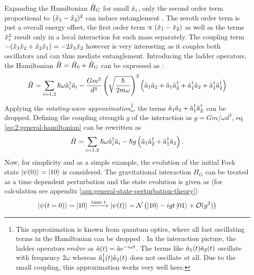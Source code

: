 Expanding the Hamiltonian $\hat{H}_G$ for small $\hat{x}_i$, only the second order term proportional to $(\hat{x}_1 - \hat{x}_2)^2$ can induce entanglement \cite{Krisnanda_2020}. The zeroth order term is just a overall energy offset, the first order term $\propto (\hat{x}_1 - \hat{x}_2)$ as well as the terms $\hat{x}^2_i$ result only in a local interaction for each mass separately. The coupling term $ - (\hat{x}_1\hat{x}_2 + \hat{x}_2\hat{x}_1) = -2\hat{x}_1\hat{x}_2$ however is very interesting as it couples both oscillators and can thus mediate entanglement.
Introducing the ladder operators, the Hamiltonian $\hat{H}=\hat{H}_0 + \hat{H}_G$ can be expressed as \cite{Carney_2018}:
\begin{equation}\label{eq:2:general-hamiltonian}
  \hat{H} = \sum_{i=1,2} \hbar \omega \hat{a}_i^\dagger \hat{a}_i - \frac{Gm^2}{d^3} \left(\sqrt{\frac{\hbar}{2m\omega}}\right)^2 \left( \hat{a}_1\hat{a}_2 + \hat{a}_1\hat{a}^\dagger_2 + \hat{a}^\dagger_1\hat{a}_2 + \hat{a}^\dagger_1\hat{a}^\dagger_2 \right)
\end{equation}
Applying the \textit{rotating-wave approximation}\footnote{This approximation is known from quantum optics, where all fast oscillating terms in the Hamiltonian can be dropped \cite{Carney_2018,Lami_2024}. In the interaction picture, the ladder operators evolve as $\hat{a}(t) = \hat{a}e^{-i\omega t}$. The terms like $\hat{a}_1(t)\hat{a}_2(t)$ oscillate with frequency $2\omega$ whereas $\hat{a}_1^\dagger(t) \hat{a}_2(t)$ does not oscillate at all. Due to the small coupling, this approximation works very well here.}, the terms $\hat{a}_1\hat{a}_2 + \hat{a}^\dagger_1\hat{a}^\dagger_2$ can be dropped. Defining the coupling strength $g$ of the interaction as $g = Gm/\omega d^3$, eq \eqref{eq:2:general-hamiltonian} can be rewritten as
\begin{equation}
  \hat{H} = \sum_{i=1,2} \hbar \omega \hat{a}_i^\dagger \hat{a}_i - \hbar g \left( \hat{a}_1\hat{a}^\dagger_2 + \hat{a}^\dagger_1\hat{a}_2 \right) .
\end{equation}
Now, for simplicity and as a simple example, the evolution of the initial Fock state $\ket{\psi(0)} = \ket{10}$ is considered. The gravitational interaction $H_G$ can be treated as a time dependent perturbation and the state evolution is given as (for calculation see appendix \ref{apx:general-state-perturbation-theory}) \cite{Carney_2018}
\begin{equation} \label{eq:2:general-evolved-state}
  \ket{\psi(t = 0)} = \ket{10} \xrightarrow{\text{time }t} \ket{\psi(t)} =  \mathcal{N} \left(\ket{10} - i g t \ket{01} + \mathcal{O}(g^2) \right)
\end{equation}

